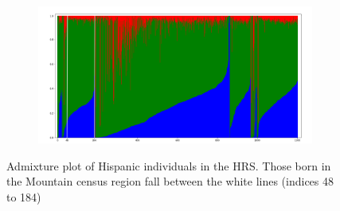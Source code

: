 \documentclass[12pt]{pnas-new}
\begin{document}

\begin{figure}
    \centering
    \begin{subfigure}{\textwidth}
    \includegraphics[width=\textwidth]{images/admixture_plot_highlight_mountain_copy.pdf}
    \end{subfigure}
    \caption{Admixture plot of Hispanic individuals in the HRS. Those born in the Mountain census region fall between the white lines (indices 48 to 184)}
    \label{fig:supp_hrs_hisp_admix}
\end{figure}

\end{document}
